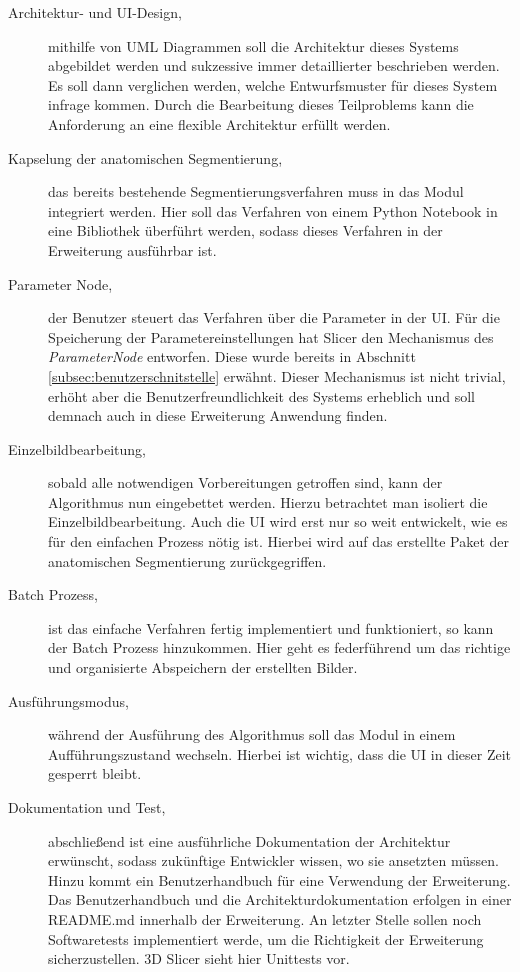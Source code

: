 \begin{description}
	\item[Architektur- und \ac{UI}-Design,] mithilfe von UML Diagrammen soll die Architektur
		dieses Systems abgebildet werden und sukzessive immer detaillierter beschrieben
		werden. Es soll dann verglichen werden, welche Entwurfsmuster für dieses System
		infrage kommen. Durch die Bearbeitung dieses Teilproblems kann die
		Anforderung an eine flexible Architektur erfüllt werden.

	\item[Kapselung der anatomischen Segmentierung,] das bereits bestehende Segmentierungsverfahren
		muss in das Modul integriert werden. Hier soll das Verfahren von einem
		Python Notebook in eine Bibliothek überführt werden, sodass dieses Verfahren
		in der Erweiterung ausführbar ist.

	\item[Parameter Node,] der Benutzer steuert das Verfahren über die Parameter in
		der \ac{UI}. Für die Speicherung der Parametereinstellungen hat Slicer den Mechanismus
		des \textit{ParameterNode} entworfen. Diese wurde bereits in Abschnitt \ref{subsec:benutzerschnitstelle}
		erwähnt. Dieser Mechanismus ist nicht trivial, erhöht aber die Benutzerfreundlichkeit
		des Systems erheblich und soll demnach auch in diese Erweiterung Anwendung finden.

	\item[Einzelbildbearbeitung,] sobald alle notwendigen Vorbereitungen getroffen
		sind, kann der Algorithmus nun eingebettet werden. Hierzu betrachtet man isoliert
		die Einzelbildbearbeitung. Auch die \ac{UI} wird erst nur so weit entwickelt,
		wie es für den einfachen Prozess nötig ist. Hierbei wird auf das erstellte Paket
		der anatomischen Segmentierung zurückgegriffen.

	\item[Batch Prozess,] ist das einfache Verfahren fertig implementiert und funktioniert,
		so kann der Batch Prozess hinzukommen. Hier geht es federführend um das richtige
		und organisierte Abspeichern der erstellten Bilder.

	\item[Ausführungsmodus,] während der Ausführung des Algorithmus soll das Modul
		in einem Aufführungszustand wechseln. Hierbei ist wichtig, dass die \ac{UI}
		in dieser Zeit gesperrt bleibt.

	\item[Dokumentation und Test,] abschließend ist eine ausführliche Dokumentation
		der Architektur erwünscht, sodass zukünftige Entwickler wissen, wo sie ansetzten
		müssen. Hinzu kommt ein Benutzerhandbuch für eine Verwendung der Erweiterung.
		Das Benutzerhandbuch und die Architekturdokumentation erfolgen in einer README.md
		innerhalb der Erweiterung. An letzter Stelle sollen noch Softwaretests
		implementiert werde, um die Richtigkeit der Erweiterung sicherzustellen. 3D
		Slicer sieht hier Unittests vor.
\end{description}

